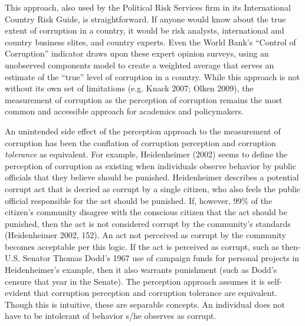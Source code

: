 \documentclass[11pt,]{article}
\begin{document}
This approach, also used by the Political Risk Services firm in its
International Country Risk Guide, is straightforward. If anyone would
know about the true extent of corruption in a country, it would be risk
analysts, international and country business elites, and country
experts. Even the World Bank's ``Control of Corruption'' indicator draws
upon these expert opinion surveys, using an unobserved components model
to create a weighted average that serves an estimate of the ``true''
level of corruption in a country. While this approach is not without its
own set of limitations (e.g. Knack 2007; Olken 2009), the measurement of
corruption as the perception of corruption remains the most common and
accessible approach for academics and policymakers.

An unintended side effect of the perception approach to the measurement
of corruption has been the conflation of corruption perception and
corruption \emph{tolerance} as equivalent. For example, Heidenheimer
(2002) seems to define the perception of corruption as existing when
individuals observe behavior by public officials that they believe
should be punished. Heidenheimer describes a potential corrupt act that
is decried as corrupt by a single citizen, who also feels the public
official responsible for the act should be punished. If, however, 99\%
of the citizen's community disagree with the conscious citizen that the
act should be punished, then the act is not considered corrupt by the
community's standards (Heidenheimer 2002, 152). An act not perceived as
corrupt by the community becomes acceptable per this logic. If the act
is perceived as corrupt, such as then-U.S. Senator Thomas Dodd's 1967
use of campaign funds for personal projects in Heidenheimer's example,
then it also warrants punishment (such as Dodd's censure that year in
the Senate). The perception approach assumes it is self-evident that
corruption perception and corruption tolerance are equivalent. Though
this is intuitive, these are separable concepts. An individual does not
have to be intolerant of behavior s/he observes as corrupt.
\end{document}
